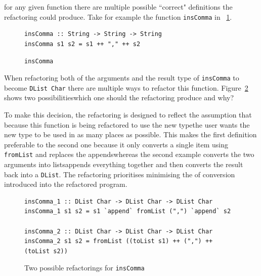 \DIFaddend for any given function there are multiple possible ``correct" definitions the refactoring could produce. Take for example the function \texttt{insComma} in \DIFdelbegin {}\DIFdelend \DIFaddbegin {}\DIFaddend ~\ref{insComma}.

\begin{figure}[t]
\begin{lstlisting}
insComma :: String -> String -> String
insComma s1 s2 = s1 ++ "," ++ s2
\end{lstlisting} 
\caption{\texttt{insComma}}
\label{insComma}
\end{figure} 

When refactoring both of the arguments and the result type of \texttt{insComma} to become \texttt{DList Char} there are multiple ways to refactor this function. Figure~\ref{commaRef} shows two possibilities\DIFdelbegin \DIFdel{, }\DIFdelend \DIFaddbegin \DIFadd{; }\DIFaddend which one should the refactoring produce and why?

To make this decision, the refactoring is designed to reflect the assumption that because this function is being refactored to use the new type\DIFaddbegin \DIFadd{, }\DIFaddend the user wants the new type to be used in as many places as possible. This makes the first definition preferable to the second one because it only converts a single item using \texttt{fromList} and replaces the appends\DIFaddbegin \DIFadd{, }\DIFaddend whereas the second example converts the two arguments into lists\DIFaddbegin \DIFadd{, }\DIFaddend appends everything together and then converts the result back into a \texttt{DList}. The refactoring prioritises minimising the \DIFdelbegin {}\DIFdelend \DIFaddbegin {}\DIFaddend of conversion introduced into the refactored program.  

\begin{figure}[t]
\begin{lstlisting}
insComma_1 :: DList Char -> DList Char -> DList Char
insComma_1 s1 s2 = s1 `append` fromList (",") `append` s2

insComma_2 :: DList Char -> DList Char -> DList Char
insComma_2 s1 s2 = fromList ((toList s1) ++ (",") ++ (toList s2))
\end{lstlisting}
\caption{Two possible refactorings for \texttt{insComma}}
\label{commaRef}
\end{figure}

